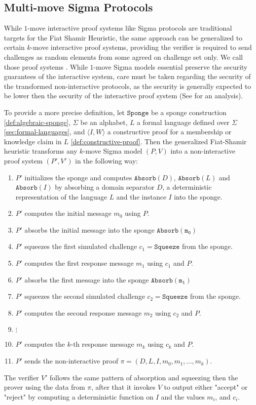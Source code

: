 \subsection{Multi-move Sigma Protocols}
While $1$-move interactive proof systems like Sigma protocols are traditional targets for the Fiat Shamir Heuristic, the same approach can be generalized to certain $k$-move interactive proof systems, providing the verifier is required to send challenges as random elements from some agreed on challenge set only. We call those proof systems . While $1$-move Sigma models essential preserve the security guarantees of the interactive system, care must be taken regarding the security of the transformed non-interactive protocols, as the security is generally expected to be lower then the security of the interactive proof system (See \cite{attema-21} for an analysis). 

To provide a more precise definition, let $\mathtt{Sponge}$ be a sponge construction \ref{def:algebraic-sponge}, $\Sigma$ be an alphabet, $L$ a formal language defined over $\Sigma$ \ref{sec:formal-languages}, and $\langle I, W\rangle$ a constructive proof for a membership or knowledge claim in $L$ \ref{def:constructive-proof}. Then the generalized Fiat-Shamir heuristic transforms any $k$-move Sigma model $(P,V)$ into a non-interactive proof system $(P',V')$ in the following way:
\begin{enumerate}
\label{def_sigma-model-fiat-shamir}
\item $P'$ initializes the sponge and computes $\mathtt{Absorb}(D)$, $\mathtt{Absorb}(L)$ and $\mathtt{Absorb}(I)$ by absorbing a domain separator $D$, a deterministic representation of the language $L$ and the instance $I$ into the sponge.
\item $P'$ computes the initial message $m_0$ using $P$.
\item $P'$ absorbs the initial message into the sponge $\mathtt{Absorb(m_0)}$
\item $P'$ squeezes the first simulated challenge $c_1=\mathtt{Squeeze}$ from the sponge.
\item $P'$ computes the first response message $m_1$ using $c_1$ and $P$.
\item $P'$ absorbs the first message into the sponge $\mathtt{Absorb(m_1)}$
\item $P'$ squeezes the second simulated challenge $c_2=\mathtt{Squeeze}$ from the sponge.
\item $P'$ computes the second response message $m_2$ using $c_2$ and $P$.
\item $\vdots$
\item $P'$ computes the $k$-th response message $m_{k}$ using $c_k$ and $P$.
\item $P'$ sends the non-interactive proof $\pi=(D,L,I, m_0,m_1,\ldots,m_{k})$.
\end{enumerate}
The verifier $V'$ follows the same pattern of absorption and squeezing then the prover using the data from $\pi$, after that it invokes $V$ to output either "accept" or "reject" by computing a deterministic function on $I$ and the values $m_i$, and $c_i$.



